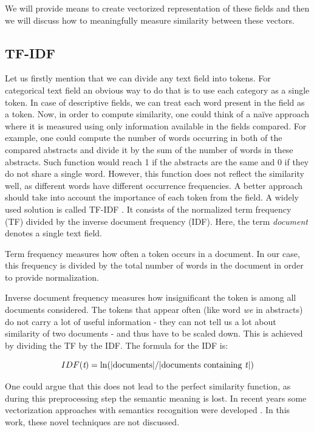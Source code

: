 \documentclass{pracamgr}
\begin{document}
We will provide means to create vectorized representation of these fields and then we will
discuss how to meaningfully measure similarity between these vectors.

\subsection{TF-IDF}

Let us firstly mention that we can divide any text field into tokens. For categorical text
field an obvious way to do that is to use each category as a single token. In case of
descriptive fields, we can treat each word present in the field as a token. Now, in order
to compute similarity, one could
think of a na\"{i}ve approach where it is measured using only information available
in the fields compared. For example, one could compute the number of words occurring in
both of the compared abstracts and divide it by the sum of the number of words in these
abstracts. Such function would reach 1 if the abstracts are the same and 0 if they do not
share a single word. However, this function does not reflect the similarity well, as different
words have different occurrence frequencies. A better approach should take into
account the importance of each token from the field. A widely used solution is called
TF-IDF \citep{Salton1983}.
It consists of the normalized term frequency (TF) divided by the inverse document frequency
(IDF). Here, the term \textit{document} denotes a single text field. 

Term frequency measures how often a token occurs in a document. In our case, this
frequency is divided by the total number of words in the document in order to provide
normalization.

Inverse document frequency measures how insignificant the token is among all documents
considered. The tokens that appear often (like word \textit{we} in abstracts) do not
carry a lot of useful information - they can not tell us a lot about similarity of two
documents - and thus have to be scaled down. This is achieved by dividing the TF by the IDF.
The formula for the IDF is:

\[ IDF(\textit{t}) = \ln(|\text{documents}|/|\text{documents containing \textit{t}}|) \]


One could argue that this does not lead to the perfect similarity function, as during
this preprocessing step the semantic meaning is lost. In recent years some vectorization
approaches with semantics recognition were developed \citep{word2vec}. In this work, these
novel techniques are not discussed.
\end{document}
